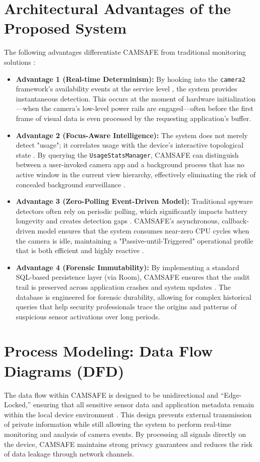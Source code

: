 \documentclass[12pt,a4paper]{report}
\begin{document}
\begin{enumerate}
    \section{Architectural Advantages of the Proposed System}
    The following advantages differentiate CAMSAFE from traditional monitoring solutions \cite{malwaresurvey}:
    \begin{itemize}
        \item \textbf{Advantage 1 (Real-time Determinism):} By hooking into the \texttt{camera2} framework's availability events at the service level \cite{androidhal}, the system provides instantaneous detection. This occurs at the moment of hardware initialization—when the camera's low-level power rails are engaged—often before the first frame of visual data is even processed by the requesting application's buffer.
        \item \textbf{Advantage 2 (Focus-Aware Intelligence):} The system does not merely detect "usage"; it correlates usage with the device's interactive topological state \cite{contextaware}. By querying the \texttt{UsageStatsManager}, CAMSAFE can distinguish between a user-invoked camera app and a background process that has no active window in the current view hierarchy, effectively eliminating the risk of concealed background surveillance \cite{placeraider}.
        \item \textbf{Advantage 3 (Zero-Polling Event-Driven Model):} Traditional spyware detectors often rely on periodic polling, which significantly impacts battery longevity and creates detection gaps \cite{malwaresurvey}. CAMSAFE's asynchronous, callback-driven model ensures that the system consumes near-zero CPU cycles when the camera is idle, maintaining a "Passive-until-Triggered" operational profile that is both efficient and highly reactive \cite{edgecomp}.
        \item \textbf{Advantage 4 (Forensic Immutability):} By implementing a standard SQL-based persistence layer (via Room), CAMSAFE ensures that the audit trail is preserved across application crashes and system updates \cite{smarthome}. The database is engineered for forensic durability, allowing for complex historical queries that help security professionals trace the origins and patterns of suspicious sensor activations over long periods.
    \end{itemize}

   \section{Process Modeling: Data Flow Diagrams (DFD)}
The data flow within CAMSAFE is designed to be unidirectional and
``Edge-Locked,'' ensuring that all sensitive sensor data and application
metadata remain within the local device environment \cite{edgecomp}. This
design prevents external transmission of private information while still
allowing the system to perform real-time monitoring and analysis of camera
events. By processing all signals directly on the device, CAMSAFE maintains
strong privacy guarantees and reduces the risk of data leakage through network
channels.


\end{enumerate}
\end{document}
